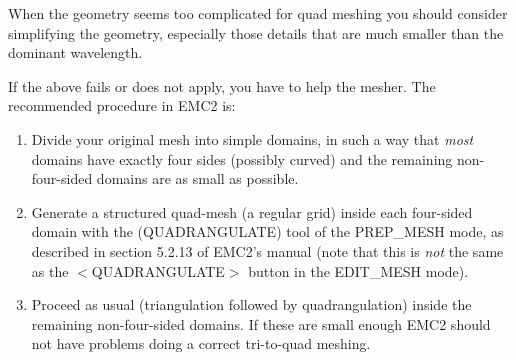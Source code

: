 When the geometry seems too complicated for quad meshing you
should consider simplifying the geometry, especially those details that are much smaller
than the dominant wavelength.

If the above fails or does not apply, you have to help the mesher. 
The recommended procedure in EMC2 is:

\begin{enumerate}
\item Divide your original mesh into simple domains,
in such a way that \emph{most} domains have exactly four sides (possibly curved)
and the remaining non-four-sided domains are as small as possible.
\item Generate a structured quad-mesh (a regular grid) inside each four-sided
domain with the \textsf{(QUADRANGULATE)} tool of the \textsf{PREP\_MESH} mode,
as described in section 5.2.13 of EMC2's manual
(note that this is \emph{not} the same as the \textsf{$<$QUADRANGULATE$>$} 
button in the \textsf{EDIT\_MESH} mode). 
\item Proceed as usual (triangulation followed by quadrangulation) 
inside the remaining non-four-sided domains. 
If these are small enough EMC2 should not have problems doing a
correct tri-to-quad meshing.
\end{enumerate}
